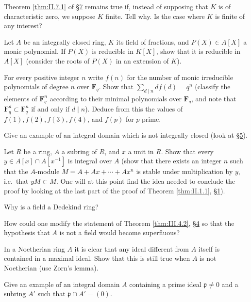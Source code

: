 

 Theorem \ref{thm:II.7.1} of \hyperref[sec:2.7]{§7} remains true if, instead of
supposing that $K$ is of characteristic zero, we suppose $K$ finite. Tell
why. Is the case where $K$ is finite of any interest?

 Let $A$ be an integrally closed ring, $K$ its field of
fractions, and $P(X)\in A[X]$ a monic polynomial. If $P(X)$ is reducible in
$K[X]$, show that it is reducible in $A[X]$ (consider the roots of $P(X)$ in
an extension of $K$).

 For every positive integer $n$ write $f(n)$ for the number of
monic irreducible polynomials of degree $n$ over $\mathbf{F}_{q}$. Show that
$\sum_{d\mid n}df(d)=q^{n}$ (classify the elements of $\mathbf{F}_{q}^{n}$
according to their minimal polynomials over $\mathbf{F}_{q}$, and note that
$\mathbf{F}_{q}^{d}\subset\mathbf{F}_{q}^{n}$ if and only if $d\mid n$).
Deduce from this the values of $f(1),f(2),f(3),f(4)$, and $f(p)$ for $p$
prime.

 Give an example of an integral domain which is not integrally
closed (look at \hyperref[sec:2.5]{§5}).

 Let $R$ be a ring, $A$ a subring of $R$, and $x$ a unit in $R$.
Show that every $y\in A[x]\cap A[x^{-1}]$ is integral over $A$ (show that
there exists an integer $n$ such that the $A$-module
$M=A+Ax+\cdots+Ax^{n}$ is stable under multiplication by $y$, i.e.\ that
$yM\subset M$. One will at this point find the idea needed to conclude the
proof by looking at the last part of the proof of Theorem
\ref{thm:II.1.1}, \hyperref[sec:2.1]{§1}).



 Why is a field a Dedekind ring?

 How could one modify the statement of Theorem \ref{thm:III.4.2},
\hyperref[sec:3.4]{§4} so that the hypothesis that $A$ is not a field would become superfluous?

 In a Noetherian ring $A$ it is clear that any ideal different
from $A$ itself is contained in a maximal ideal. Show that this is still
true when $A$ is not Noetherian (use Zorn's lemma).

 Give an example of an integral domain $A$ containing a prime
ideal $\mathfrak{p}\neq0$ and a subring $A'$ such that
$\mathfrak{p}\cap A'=(0)$.

